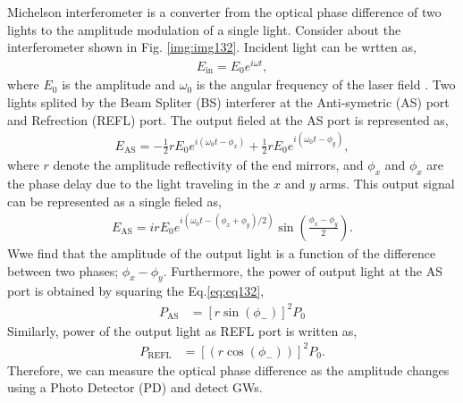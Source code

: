 Michelson interferometer is a converter from the optical phase difference of two lights to the amplitude modulation of a single light. Consider about the interferometer shown in Fig. \ref{img:img132}. Incident light can be wrtten as,
\begin{eqnarray}
  E_{\mathrm{in}} = E_{0} e^{i\omega{t}},
\end{eqnarray}
where $E_0$ is the amplitude and $\omega_0$ is the angular frequency of the laser field
. Two lights splited by the Beam Spliter (BS) interferer at the Anti-symetric (AS) port and Refrection (REFL) port. The output fieled at the AS port is represented as,
\begin{eqnarray}
  E_{\mathrm{AS}} = -\frac{1}{2}rE_{0} e^{i\left(\omega_{0} t-\phi_{x}\right)}+\frac{1}{2}r E_{0} e^{i\left(\omega_{0} t-\phi_{y}\right)},
\end{eqnarray}
where $r$ denote the amplitude reflectivity of the end mirrors, and $\phi_{x}$ and $\phi_{x}$ are the phase delay due to the light traveling in the $x$ and $y$ arms. This output signal can be represented as a single fieled as,
\begin{eqnarray}
E_{\mathrm{AS}} = i r E_{0} e^{i\left(\omega_{0} t-\left(\phi_{x}+\phi_{y}\right) / 2\right)} \sin \left(\frac{\phi_{x}-\phi_{y}}{2}\right). \label{eq:eq132}
\end{eqnarray} 
Wwe find that the amplitude of the output light is a function of the difference between two phases; $\phi_{x}-\phi_{y}$. Furthermore, the power of output light at the AS port is obtained by squaring the Eq.\ref{eq:eq132}, 
\begin{eqnarray}
  P_{\mathrm{AS}} &=\left[r\sin({\phi_{-}})\right]^2P_0  \label{eq:eq133}
\end{eqnarray}
Similarly, power of the output light as REFL port is written as,
\begin{eqnarray}
  P_{\mathrm{REFL}} &=\left[(r\cos({\phi_{-}}))\right]^2P_0. \label{eq:eq134}
\end{eqnarray}
Therefore, we can measure the optical phase difference as the amplitude changes using a Photo Detector (PD) and detect GWs.


